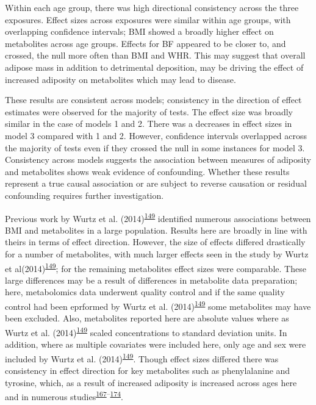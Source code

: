 \documentclass[11pt,twoside]{bristolthesis}
\begin{document}
Within each age group, there was high directional consistency across the three exposures. Effect sizes across exposures were similar within age groups, with overlapping confidence intervals; BMI showed a broadly higher effect on metabolites across age groups. Effects for BF appeared to be closer to, and crossed, the null more often than BMI and WHR. This may suggest that overall adipose mass in addition to detrimental deposition, may be driving the effect of increased adiposity on metabolites which may lead to disease.

These results are consistent across models; consistency in the direction of effect estimates were observed for the majority of tests. The effect size was broadly similar in the case of models 1 and 2. There was a decreases in effect sizes in model 3 compared with 1 and 2. However, confidence intervals overlapped across the majority of tests even if they crossed the null in some instances for model 3. Consistency across models suggests the association between measures of adiposity and metabolites shows weak evidence of confounding. Whether these results represent a true causal association or are subject to reverse causation or residual confounding requires further investigation.

Previous work by Wurtz et al. (2014)\textsuperscript{\protect\hyperlink{ref-Wurtz2014}{149}} identified numerous associations between BMI and metabolites in a large population. Results here are broadly in line with theirs in terms of effect direction. However, the size of effects differed drastically for a number of metabolites, with much larger effects seen in the study by Wurtz et al(2014)\textsuperscript{\protect\hyperlink{ref-Wurtz2014}{149}}; for the remaining metabolites effect sizes were comparable. These large differences may be a result of differences in metabolite data preparation; here, metabolomics data underwent quality control and if the same quality control had been eprformed by Wurtz et al. (2014)\textsuperscript{\protect\hyperlink{ref-Wurtz2014}{149}} some metabolites may have been excluded. Also, metabolites reported here are absolute values where as Wurtz et al. (2014)\textsuperscript{\protect\hyperlink{ref-Wurtz2014}{149}} scaled concentrations to standard deviation units. In addition, where as multiple covariates were included here, only age and sex were included by Wurtz et al. (2014)\textsuperscript{\protect\hyperlink{ref-Wurtz2014}{149}}. Though effect sizes differed there was consistency in effect direction for key metabolites such as phenylalanine and tyrosine, which, as a result of increased adiposity is increased across ages here and in numerous studies\textsuperscript{\protect\hyperlink{ref-Haufe2016}{167}--\protect\hyperlink{ref-Kim2010b}{174}}.
\end{document}
